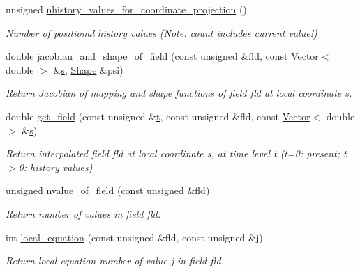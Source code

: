 \begin{DoxyCompactItemize}
unsigned \hyperlink{classoomph_1_1ProjectableTaylorHoodElement_a7b93892cedb3a4da3dc9f30c186fdec4}{nhistory\+\_\+values\+\_\+for\+\_\+coordinate\+\_\+projection} ()
\begin{DoxyCompactList}\small\item\em Number of positional history values (Note\+: count includes current value!) \end{DoxyCompactList}\item 
double \hyperlink{classoomph_1_1ProjectableTaylorHoodElement_a1893ca2bf9bf81d12350b9534cbf30d8}{jacobian\+\_\+and\+\_\+shape\+\_\+of\+\_\+field} (const unsigned \&fld, const \hyperlink{classoomph_1_1Vector}{Vector}$<$ double $>$ \&\hyperlink{cfortran_8h_ab7123126e4885ef647dd9c6e3807a21c}{s}, \hyperlink{classoomph_1_1Shape}{Shape} \&psi)
\begin{DoxyCompactList}\small\item\em Return Jacobian of mapping and shape functions of field fld at local coordinate s. \end{DoxyCompactList}\item 
double \hyperlink{classoomph_1_1ProjectableTaylorHoodElement_aff36e945b4f1c625b5b539bac2518b6f}{get\+\_\+field} (const unsigned \&\hyperlink{cfortran_8h_af6f0bd3dc13317f895c91323c25c2b8f}{t}, const unsigned \&fld, const \hyperlink{classoomph_1_1Vector}{Vector}$<$ double $>$ \&\hyperlink{cfortran_8h_ab7123126e4885ef647dd9c6e3807a21c}{s})
\begin{DoxyCompactList}\small\item\em Return interpolated field fld at local coordinate s, at time level t (t=0\+: present; t$>$0\+: history values) \end{DoxyCompactList}\item 
unsigned \hyperlink{classoomph_1_1ProjectableTaylorHoodElement_acc580c5ee1ce18d7d6b42d67e9323e99}{nvalue\+\_\+of\+\_\+field} (const unsigned \&fld)
\begin{DoxyCompactList}\small\item\em Return number of values in field fld. \end{DoxyCompactList}\item 
int \hyperlink{classoomph_1_1ProjectableTaylorHoodElement_abbe179e61df43528604207a4eddcd0e6}{local\+\_\+equation} (const unsigned \&fld, const unsigned \&j)
\begin{DoxyCompactList}\small\item\em Return local equation number of value j in field fld. \end{DoxyCompactList}\end{DoxyCompactItemize}
